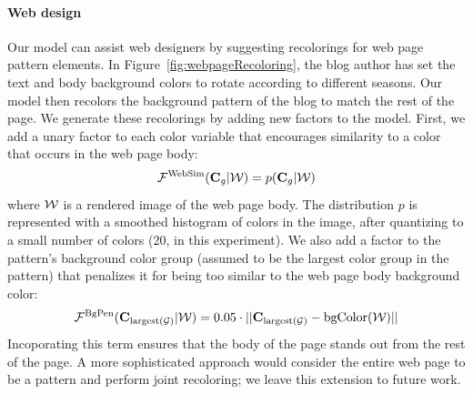 \paragraph{Web design}
Our model can assist web designers by suggesting recolorings for web page pattern elements. In Figure~\ref{fig:webpageRecoloring}, the blog author has set the text and body background colors to rotate according to different seasons. Our model then recolors the background pattern of the blog to match the rest of the page. We generate these recolorings by adding new factors to the model. First, we add a unary factor to each color variable that encourages similarity to a color that occurs in the web page body:
\begin{equation*}
\mathcal{F}^\textrm{WebSim}(\mathbf{C}_g | \mathcal{W}) = p(\mathbf{C}_g | \mathcal{W})
\end{equation*}
where $\mathcal{W}$ is a rendered image of the web page body. The distribution $p$ is represented with a smoothed histogram of colors in the image, after quantizing to a small number of colors (20, in this experiment).
We also add a factor to the pattern's background color group (assumed to be the largest color group in the pattern) that penalizes it for being too similar to the web page body background color:
\begin{equation*}
\mathcal{F}^\textrm{BgPen}(\mathbf{C}_{\textrm{largest}(\mathcal{G})} | \mathcal{W}) = 0.05 \cdot || \mathbf{C}_{\textrm{largest}(\mathcal{G})} - \textrm{bgColor}(\mathcal{W}) ||
\end{equation*}
Incoporating this term ensures that the body of the page stands out from the rest of the page. A more sophisticated approach would consider the entire web page to be a pattern and perform joint recoloring; we leave this extension to future work.


